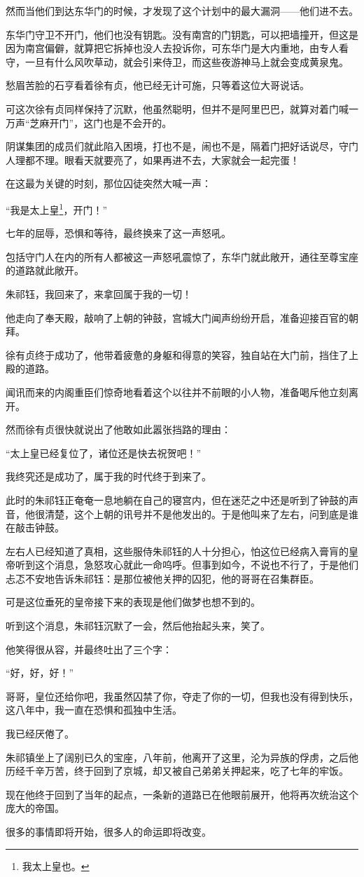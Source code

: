 \begin{multicols}{\theparacolNo}
然而当他们到达东华门的时候，才发现了这个计划中的最大漏洞——他们进不去。

东华门守卫不开门，他们也没有钥匙。没有南宫的门钥匙，可以把墙撞开，但这是因为南宫偏僻，就算把它拆掉也没人去投诉你，可东华门是大内重地，由专人看守，一旦有什么风吹草动，就会引来侍卫，而这些夜游神马上就会变成黄泉鬼。

愁眉苦脸的石亨看着徐有贞，他已经无计可施，只等着这位大哥说话。

可这次徐有贞同样保持了沉默，他虽然聪明，但并不是阿里巴巴，就算对着门喊一万声“芝麻开门”，这门也是不会开的。

阴谋集团的成员们就此陷入困境，打也不是，闹也不是，隔着门把好话说尽，守门人理都不理。眼看天就要亮了，如果再进不去，大家就会一起完蛋！

在这最为关键的时刻，那位囚徒突然大喊一声：

“我是太上皇\footnote{我太上皇也。}，开门！”

七年的屈辱，恐惧和等待，最终换来了这一声怒吼。

包括守门人在内的所有人都被这一声怒吼震惊了，东华门就此敞开，通往至尊宝座的道路就此敞开。

朱祁钰，我回来了，来拿回属于我的一切！

他走向了奉天殿，敲响了上朝的钟鼓，宫城大门闻声纷纷开启，准备迎接百官的朝拜。

徐有贞终于成功了，他带着疲惫的身躯和得意的笑容，独自站在大门前，挡住了上殿的道路。

闻讯而来的内阁重臣们惊奇地看着这个以往并不前眼的小人物，准备喝斥他立刻离开。

然而徐有贞很快就说出了他敢如此嚣张挡路的理由：

“太上皇已经复位了，诸位还是快去祝贺吧！”

我终究还是成功了，属于我的时代终于到来了。

此时的朱祁钰正奄奄一息地躺在自己的寝宫内，但在迷茫之中还是听到了钟鼓的声音，他很清楚，这个上朝的讯号并不是他发出的。于是他叫来了左右，问到底是谁在敲击钟鼓。

左右人已经知道了真相，这些服侍朱祁钰的人十分担心，怕这位已经病入膏肓的皇帝听到这个消息，急怒攻心就此一命呜呼。但事到如今，不说也不行了，于是他们忐忑不安地告诉朱祁钰：是那位被他关押的囚犯，他的哥哥在召集群臣。

可是这位垂死的皇帝接下来的表现是他们做梦也想不到的。

听到这个消息，朱祁钰沉默了一会，然后他抬起头来，笑了。

他笑得很从容，并最终吐出了三个字：

“好，好，好！”

哥哥，皇位还给你吧，我虽然囚禁了你，夺走了你的一切，但我也没有得到快乐，这八年中，我一直在恐惧和孤独中生活。

我已经厌倦了。

朱祁镇坐上了阔别已久的宝座，八年前，他离开了这里，沦为异族的俘虏，之后他历经千辛万苦，终于回到了京城，却又被自己弟弟关押起来，吃了七年的牢饭。

现在他终于回到了当年的起点，一条新的道路已在他眼前展开，他将再次统治这个庞大的帝国。

很多的事情即将开始，很多人的命运即将改变。
\ifnum{}
	\end{multicols}
\fi
